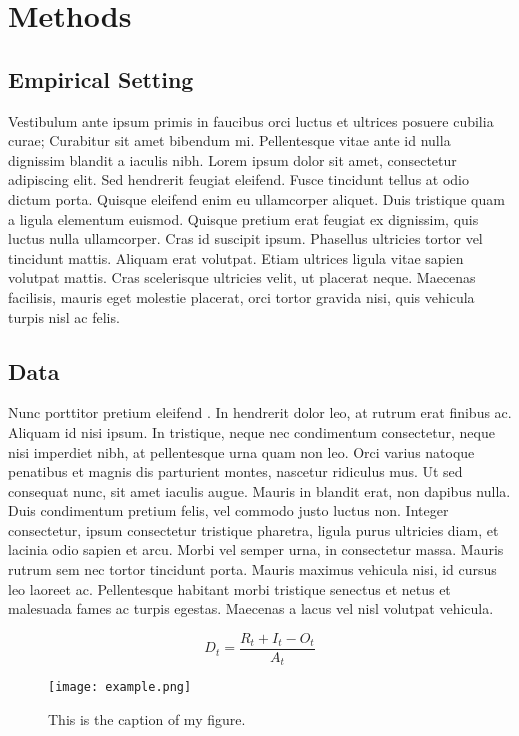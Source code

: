 \documentclass[12pt,letterpaper]{article} %
\begin{document}
	\section*{Methods}
	\subsection*{Empirical Setting}
	Vestibulum ante ipsum primis in faucibus orci luctus et ultrices posuere cubilia curae; Curabitur sit amet bibendum mi. Pellentesque vitae ante id nulla dignissim blandit a iaculis nibh. Lorem ipsum dolor sit amet, consectetur adipiscing elit. Sed hendrerit feugiat eleifend. Fusce tincidunt tellus at odio dictum porta. Quisque eleifend enim eu ullamcorper aliquet. Duis tristique quam a ligula elementum euismod. Quisque pretium erat feugiat ex dignissim, quis luctus nulla ullamcorper. Cras id suscipit ipsum. Phasellus ultricies tortor vel tincidunt mattis. Aliquam erat volutpat. Etiam ultrices ligula vitae sapien volutpat mattis. Cras scelerisque ultricies velit, ut placerat neque. Maecenas facilisis, mauris eget molestie placerat, orci tortor gravida nisi, quis vehicula turpis nisl ac felis.
	
	\subsection*{Data}
	Nunc porttitor pretium eleifend \citep{sinatra_quantifying_2016}. In hendrerit dolor leo, at rutrum erat finibus ac. Aliquam id nisi ipsum. In tristique, neque nec condimentum consectetur, neque nisi imperdiet nibh, at pellentesque urna quam non leo. Orci varius natoque penatibus et magnis dis parturient montes, nascetur ridiculus mus. Ut sed consequat nunc, sit amet iaculis augue. Mauris in blandit erat, non dapibus nulla. Duis condimentum pretium felis, vel commodo justo luctus non. Integer consectetur, ipsum consectetur tristique pharetra, ligula purus ultricies diam, et lacinia odio sapien et arcu. Morbi vel semper urna, in consectetur massa. Mauris rutrum sem nec tortor tincidunt porta. Mauris maximus vehicula nisi, id cursus leo laoreet ac. Pellentesque habitant morbi tristique senectus et netus et malesuada fames ac turpis egestas. Maecenas a lacus vel nisl volutpat vehicula.
	
	\begin{equation}
		\label{eq:my_equation}
		D_t = \frac{R_t + I_t - O_t}{A_t}
	\end{equation}
	
	\begin{figure*}[htbp]
		\centering
		\texttt{[image: example.png]}
		\caption{This is the caption of my figure.}
		\label{fig:my_figure}
	\end{figure*}
	
\end{document}
